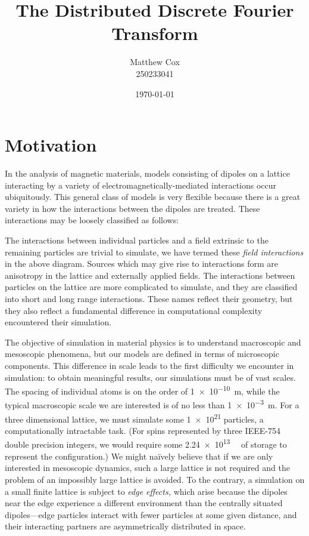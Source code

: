 \documentclass{article}
\author{Matthew Cox\\250233041}
\date{\today}
\title{The Distributed Discrete Fourier Transform}
\theoremstyle{definition}
\begin{document}
\maketitle

\tableofcontents

\section{Motivation}
In the analysis of magnetic materials, models consisting of dipoles on a lattice
interacting by a variety of electromagnetically-mediated interactions occur
ubiquitously. This general class of models is very flexible because there is a
great variety in how the interactions between the dipoles are treated. These
interactions may be loosely classified as follows:


The interactions between individual particles and a field extrinsic to the
remaining particles are trivial to simulate, we have termed these \emph{field
interactions} in the above diagram. Sources which may give rise to interactions
form are anisotropy in the lattice and externally applied fields. The
interactions between particles on the lattice are more complicated to simulate,
and they are classified into short and long range interactions. These names
reflect their geometry, but they also reflect a fundamental difference in
computational complexity encountered their simulation.

The objective of simulation in material physics is to understand macroscopic and
mesoscopic phenomena, but our models are defined in terms of microscopic
components. This difference in scale leads to the first difficulty we encounter
in simulation: to obtain meaningful results, our simulations must be of vast
scales. The spacing of individual atoms is on the order of
\SI{1e-10}{\meter}, while the typical macroscopic scale we are interested is of
no less than \SI{1e-3}{m}. For a three dimensional lattice, we must simulate
some \num{1e21} particles, a computationally intractable task. (For spins
represented by three IEEE-754 double precision integers, we would require some
\SI{2.24e13}{\gibi\byte} of storage to represent the configuration.) We might
naïvely believe that if we are only interested in mesoscopic dynamics, such a
large lattice is not required and the problem of an impossibly large lattice is
avoided. To the contrary, a simulation on a small finite lattice is subject to
\emph{edge effects,} which arise because the dipoles near the edge experience a
different environment than the centrally situated dipoles---edge particles
interact with fewer particles at some given distance, and their interacting
partners are asymmetrically distributed in space.
\end{document}
